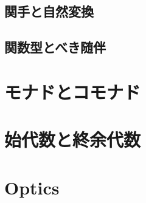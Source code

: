 \documentclass[uplatex,dvipdfmx]{jsarticle}
\begin{document}
  \subsection{関手と自然変換}
  \subsection{関数型とべき随伴}
  \section{モナドとコモナド}
  \section{始代数と終余代数}
  \section{Optics}
\end{document}
